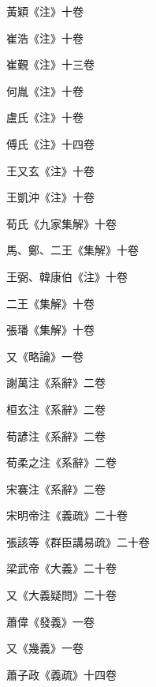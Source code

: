 \begin{pinyinscope}
 黃穎《注》十卷



 崔浩《注》十卷



 崔覲《注》十三卷



 何胤《注》十卷



 盧氏《注》十卷



 傅氏《注》十四卷



 王又玄《注》十卷



 王凱沖《注》十卷



 荀氏《九家集解》十卷



 馬、鄭、二王《集解》十卷



 王弼、韓康伯《注》十卷



 二王《集解》十卷



 張璠《集解》十卷



 又《略論》一卷



 謝萬注《系辭》二卷



 桓玄注《系辭》二卷



 荀諺注《系辭》二卷



 荀柔之注《系辭》二卷



 宋褰注《系辭》二卷



 宋明帝注《義疏》二十卷



 張該等《群臣講易疏》二十卷



 梁武帝《大義》二十卷



 又《大義疑問》二十卷



 蕭偉《發義》一卷



 又《幾義》一卷



 蕭子政《義疏》十四卷




\end{pinyinscope}

